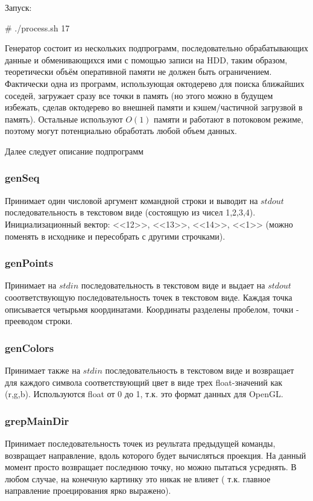 \documentclass{article}
\begin{document}
Запуск:

\# ./process.sh 17

Генератор состоит из нескольких подпрограмм, последовательно обрабатывающих данные и обменивающихся ими с помощью записи на HDD, таким образом, теоретически объём оперативной памяти не должен быть ограничением. Фактически одна из программ, использующая октодерево для поиска ближайших соседей, загружает сразу все точки в память (но этого можно в будущем избежать, сделав октодерево во внешней памяти и кэшем/частичной загрузвой в память). Остальные используют $O(1)$ памяти и работают в потоковом режиме, поэтому могут потенциально обработать любой объем данных. 

Далее следует описание подпрограмм

\subsubsection{genSeq}
Принимает один числовой аргумент командной строки и выводит на $stdout$ последовательность в текстовом виде (состоящую из чисел 1,2,3,4). Инициализационный вектор: <<12>>, <<13>>, <<14>>, <<1>> (можно поменять в исходнике и пересобрать с другими строчками).

\subsubsection{genPoints}
Принимает на $stdin$ последовательность в текстовом виде и выдает на $stdout$ сооответствующую последовательность точек в текстовом виде. Каждая точка описывается четырьмя координатами. Координаты разделены пробелом, точки - прееводом строки.

\subsubsection{genColors}
Принимает также на $stdin$ последовательность в текстовом виде и возвращает для каждого символа соответствующий цвет в виде трех float-значений как (r,g,b). Используются float от 0 до 1, т.к. это формат данных для OpenGL.

\subsubsection{grepMainDir}
Принимает последовательность точек из реультата предыдущей команды, возвращает направление, вдоль которого будет вычисляться проекция. На данный момент просто возвращает последнюю точку, но можно пытаться усреднять. В любом случае, на конечную картинку это никак не влияет ( т.к. главное направление проецирования ярко выражено).
\end{document}

